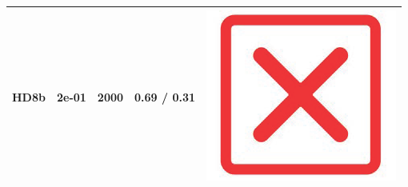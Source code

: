 \begin{table}[!h]
{\begin{tabular}[t]{ccccc}
\midrule
\addlinespace
HD8b & 2e-01 & 2000 & 0.69 / 0.31 & \includegraphics[scale=0.05]{figs/red_cross.png}\\
\midrule
\bottomrule
\end{tabular}}
\end{table}

\newpage

